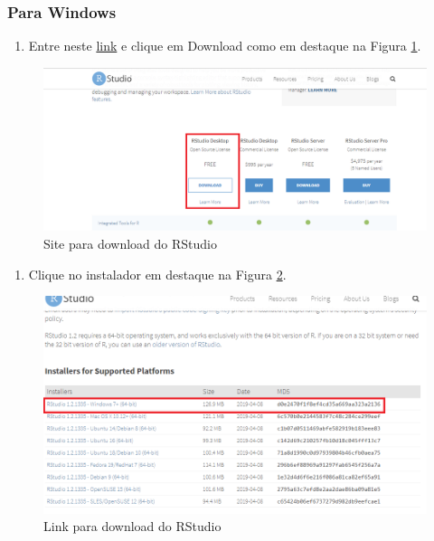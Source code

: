 \documentclass[
]{book}
\providecommand{\tightlist}{%
  \setlength{\itemsep}{0pt}\setlength{\parskip}{0pt}}
\begin{document}
\hypertarget{para-windows-1}{%
\subsubsection{Para Windows}\label{para-windows-1}}

\begin{enumerate}
\def\labelenumi{\arabic{enumi})}
\tightlist
\item
  Entre neste \href{https://www.rstudio.com/products/rstudio/download/}{link} e clique em Download como em destaque na Figura \ref{fig:rswindows1}.
\end{enumerate}

\begin{figure}
\includegraphics[width=1\linewidth]{figures/install_Rstudio1} \caption{\label{fig:rswindows1}Site para download do RStudio}\label{fig:rswindows1}
\end{figure}

\begin{enumerate}
\def\labelenumi{\arabic{enumi})}
\setcounter{enumi}{1}
\tightlist
\item
  Clique no instalador em destaque na Figura \ref{fig:rswindows2}.
\end{enumerate}

\begin{figure}
\includegraphics[width=1\linewidth]{figures/install_Rstudio2} \caption{\label{fig:rswindows2}Link para download do RStudio}\label{fig:rswindows2}
\end{figure}
\end{document}
